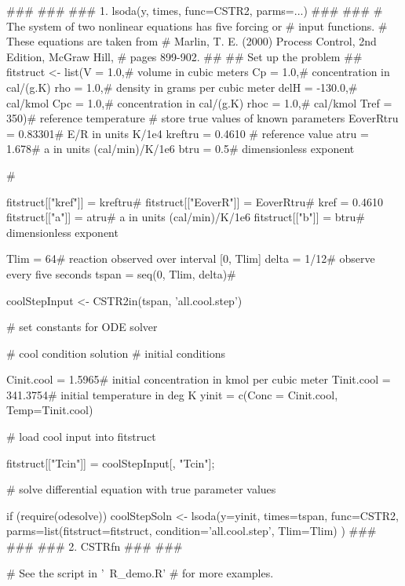 \begin{SeeAlso}\relax
{}
\end{SeeAlso}
\begin{Examples}
\begin{ExampleCode}
###
###
### 1.  lsoda(y, times, func=CSTR2, parms=...)
###
###
#  The system of two nonlinear equations has five forcing or  
#  input functions.
#  These equations are taken from
#  Marlin, T. E. (2000) Process Control, 2nd Edition, McGraw Hill,
#  pages 899-902.
##
##  Set up the problem 
##
fitstruct <- list(V    = 1.0,#  volume in cubic meters 
                  Cp   = 1.0,#  concentration in cal/(g.K)
                  rho  = 1.0,#  density in grams per cubic meter 
                  delH = -130.0,# cal/kmol
                  Cpc  = 1.0,#  concentration in cal/(g.K)
                  rhoc = 1.0,#  cal/kmol
                  Tref = 350)#  reference temperature
#  store true values of known parameters 
EoverRtru = 0.83301#   E/R in units K/1e4
kreftru   = 0.4610 #   reference value
atru      = 1.678#     a in units (cal/min)/K/1e6
btru      = 0.5#       dimensionless exponent

#

fitstruct[["kref"]]   = kreftru#      
fitstruct[["EoverR"]] = EoverRtru#  kref = 0.4610
fitstruct[["a"]]      = atru#       a in units (cal/min)/K/1e6
fitstruct[["b"]]      = btru#       dimensionless exponent
 
Tlim  = 64#    reaction observed over interval [0, Tlim]
delta = 1/12#  observe every five seconds
tspan = seq(0, Tlim, delta)#

coolStepInput <- CSTR2in(tspan, 'all.cool.step')

#  set constants for ODE solver

#  cool condition solution
#  initial conditions

Cinit.cool = 1.5965#  initial concentration in kmol per cubic meter
Tinit.cool = 341.3754# initial temperature in deg K
yinit = c(Conc = Cinit.cool, Temp=Tinit.cool)

#  load cool input into fitstruct

fitstruct[["Tcin"]] = coolStepInput[, "Tcin"];

#  solve  differential equation with true parameter values

if (require(odesolve)) {
coolStepSoln <- lsoda(y=yinit, times=tspan, func=CSTR2,
  parms=list(fitstruct=fitstruct, condition='all.cool.step', Tlim=Tlim) )
}
###
###
### 2.  CSTRfn 
###
###

# See the script in '~R\library\fda\scripts\CSTR\CSTR_demo.R'
#  for more examples.  

\end{ExampleCode}
\end{Examples}

